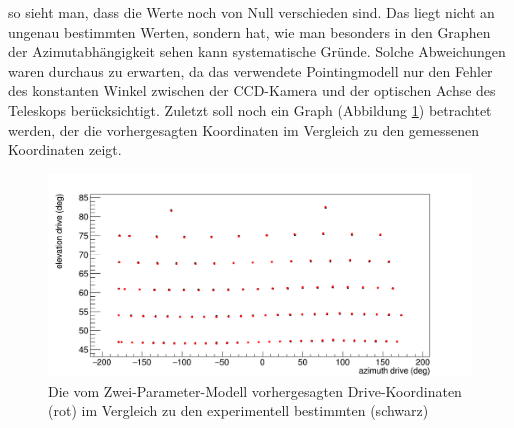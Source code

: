 so sieht man, dass die Werte noch von Null verschieden sind. Das liegt nicht an ungenau bestimmten Werten, sondern hat, wie man besonders in den Graphen der Azimutabhängigkeit sehen kann systematische Gründe. Solche Abweichungen waren durchaus zu erwarten, da das verwendete Pointingmodell nur den Fehler des konstanten Winkel zwischen der CCD-Kamera und der optischen Achse des Teleskops berücksichtigt. Zuletzt soll noch ein Graph (Abbildung \ref{img:C2Dcomp2}) betrachtet werden, der die vorhergesagten Koordinaten im Vergleich zu den gemessenen Koordinaten zeigt.
\begin{figure}[htbp]
\centering
\includegraphics[width=\textwidth]{../341/C2Dcomp2.png}
\caption{Die vom Zwei-Parameter-Modell vorhergesagten Drive-Koordinaten (rot) im Vergleich zu den experimentell bestimmten (schwarz)}
\label{img:C2Dcomp2}
\end{figure}

